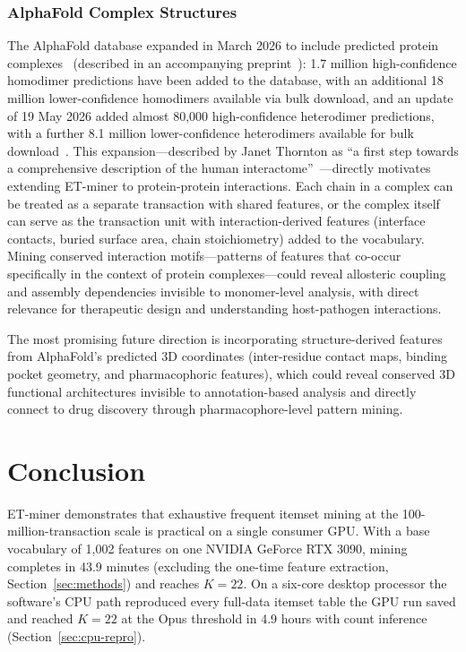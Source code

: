 \documentclass[10pt,a4paper,twocolumn]{article}
\begin{document}
\subsubsection*{AlphaFold Complex Structures}

The AlphaFold database expanded in March 2026 to include predicted protein complexes~\cite{afdb2026news} (described in an accompanying preprint~\cite{han2026afdb}): 1.7 million high-confidence homodimer predictions have been added to the database, with an additional 18 million lower-confidence homodimers available via bulk download, and an update of 19 May 2026 added almost 80,000 high-confidence heterodimer predictions, with a further 8.1 million lower-confidence heterodimers available for bulk download~\cite{afdb2026news}. This expansion---described by Janet Thornton as ``a first step towards a comprehensive description of the human interactome''~\cite{afdb2026news}---directly motivates extending ET-miner to protein-protein interactions. Each chain in a complex can be treated as a separate transaction with shared features, or the complex itself can serve as the transaction unit with interaction-derived features (interface contacts, buried surface area, chain stoichiometry) added to the vocabulary. Mining conserved interaction motifs---patterns of features that co-occur specifically in the context of protein complexes---could reveal allosteric coupling and assembly dependencies invisible to monomer-level analysis, with direct relevance for therapeutic design and understanding host-pathogen interactions.

The most promising future direction is incorporating structure-derived features from AlphaFold's predicted 3D coordinates (inter-residue contact maps, binding pocket geometry, and pharmacophoric features), which could reveal conserved 3D functional architectures invisible to annotation-based analysis and directly connect to drug discovery through pharmacophore-level pattern mining.
\setlength{\parindent}{1em}%

\section{Conclusion}
\label{sec:conclusion}

ET-miner demonstrates that exhaustive frequent itemset mining at the 100-million-transaction scale is practical on a single consumer GPU. With a base vocabulary of 1,002 features on one NVIDIA GeForce RTX 3090, mining completes in 43.9 minutes (excluding the one-time feature extraction, Section~\ref{sec:methods}) and reaches $K{=}22$. On a six-core desktop processor the software's CPU path reproduced every full-data itemset table the GPU run saved and reached $K{=}22$ at the Opus threshold in 4.9 hours with count inference (Section~\ref{sec:cpu-repro}).
\end{document}
